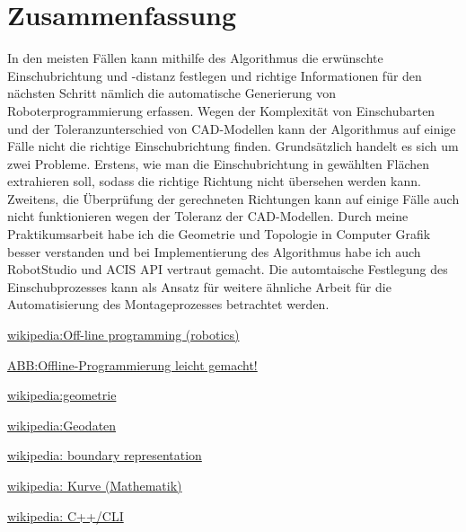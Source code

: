 \documentclass[14pt,a4paper,titlepage]{article}
\begin{document}
	\section{Zusammenfassung}
		In den meisten Fällen kann mithilfe des Algorithmus die erwünschte Einschubrichtung und -distanz festlegen und richtige Informationen für den nächsten Schritt nämlich die automatische Generierung von Roboterprogrammierung erfassen. Wegen der Komplexität von Einschubarten und der Toleranzunterschied von CAD-Modellen kann der Algorithmus auf einige Fälle nicht die richtige Einschubrichtung finden. Grundsätzlich handelt es sich um zwei Probleme. Erstens, wie man die Einschubrichtung in gewählten Flächen extrahieren soll, sodass die richtige Richtung nicht übersehen werden kann. Zweitens, die Überprüfung der gerechneten Richtungen kann auf einige Fälle auch nicht funktionieren wegen der Toleranz der CAD-Modellen.
		\bigbreak
		Durch meine Praktikumsarbeit habe ich die Geometrie und Topologie in Computer Grafik besser verstanden und bei Implementierung des Algorithmus habe ich auch RobotStudio und ACIS API vertraut gemacht. Die automtaische Festlegung des Einschubprozesses kann als Ansatz für weitere ähnliche Arbeit für die Automatisierung des Montageprozesses betrachtet werden.
	\pagebreak
	\begin{thebibliography}{1}
		\href{https://en.wikipedia.org/wiki/Off-line_programming_(robotics)}{wikipedia:Off-line programming (robotics)}
		
		\href{https://new.abb.com/products/robotics/de/robotstudio}{ABB:Offline-Programmierung leicht gemacht!}
		
		\href{https://de.wikipedia.org/wiki/Geometrie}{wikipedia:geometrie}
	
		
		\href{https://de.wikipedia.org/wiki/Geodaten#Topologie}{wikipedia:Geodaten}
		
		\href{https://en.wikipedia.org/wiki/Boundary_representation}{wikipedia: boundary representation}
		
		\href{https://de.wikipedia.org/wiki/Kurve_(Mathematik)}{wikipedia: Kurve (Mathematik)}
		
		\href{https://de.wikipedia.org/wiki/C%2B%2B/CLI}{wikipedia: C++/CLI}
	\end{thebibliography}
	\pagebreak
	\listoffigures
	\pagebreak
\end{document}
